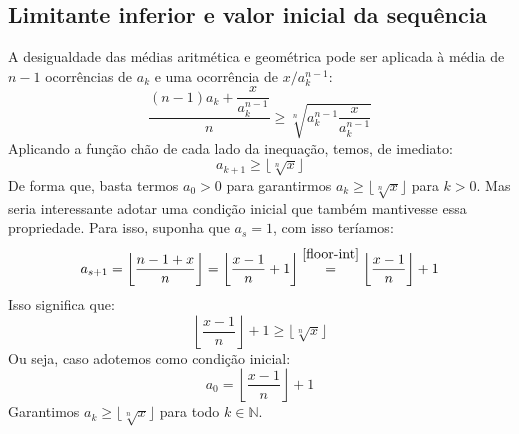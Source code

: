\subsection*{Limitante inferior e valor inicial da sequência}

A desigualdade das médias aritmética e geométrica
pode ser aplicada à média de $n - 1$ ocorrências de $a_k$
e uma ocorrência de $x/a_k^{n-1}$:
\[
  \dfrac{(n-1) a_k + \dfrac{x}{a_k^{n-1}}}{n} \ge
  \sqrt[n]{a_k^{n-1} \dfrac{x}{a_k^{n-1}}}
\]
Aplicando a função chão de cada lado da inequação, temos, de imediato:
\[
  a_{k+1} \ge \lfloor \sqrt[n]{x} \rfloor
\]
De forma que, basta termos $a_0 > 0$
para garantirmos $a_k \ge \lfloor \sqrt[n]{x} \rfloor$ para $k > 0$.
Mas seria interessante adotar uma condição inicial
que também mantivesse essa propriedade.
Para isso, suponha que $a_s = 1$, com isso teríamos:
\[
  a_{s+1}
  = \left\lfloor \dfrac{n - 1 + x}{n} \right\rfloor
  = \left\lfloor \dfrac{x - 1}{n} + 1 \right\rfloor
  \stackfirst{\eqref{floor-int}}{=}
    \left\lfloor \dfrac{x - 1}{n} \right\rfloor + 1
\]
Isso significa que:
\[
  \left\lfloor \dfrac{x - 1}{n} \right\rfloor + 1
  \ge \lfloor \sqrt[n]{x} \rfloor
\]
Ou seja, caso adotemos como condição inicial:
\[
  a_0 = \left\lfloor \dfrac{x - 1}{n} \right\rfloor + 1
\]
Garantimos $a_k \ge \lfloor \sqrt[n]{x} \rfloor$
para todo $k \in \mathds{N}$.
